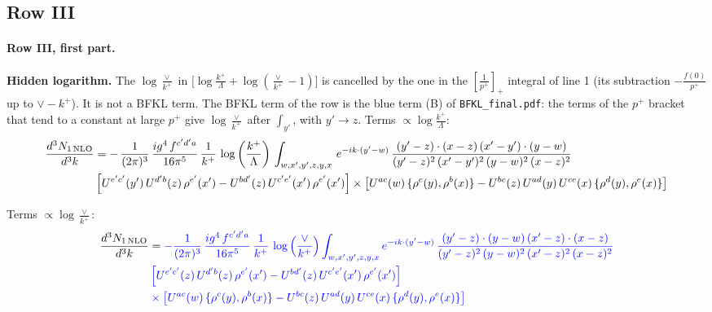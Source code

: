 \documentclass[10pt]{article}
\numberwithin{equation}{section}
\newcommand{\new}[1]{{\color{blue}#1}}
\newcommand{\nc}{\color{blue}}
\begin{document}
\subsection{Row III}
\paragraph{Row III, first part.}
\textbf{Hidden logarithm.} The $\log\frac{\vee}{k^+}$ in $\big[\log\frac{k^+}{\Lambda}+\log(\frac{\vee}{k^+}-1)\big]$ is cancelled by the one in the $\left[\frac{1}{p^+}\right]_+$ integral of line 1 (its subtraction $-\frac{f(0)}{p^+}$ up to $\vee-k^+$). It is not a BFKL term. The BFKL term of the row is the \new{blue} term (B) of \texttt{BFKL\_final.pdf}: the terms of the $p^+$ bracket that tend to a constant at large $p^+$ give $\log\frac{\vee}{k^+}$ after $\int_{y'}$, with $y'\to z$.
\noindent Terms $\propto\log\frac{k^+}{\Lambda}$:
\begin{align}
     \frac{d^{3}N_{1\,\rm NLO}}{d^{3}k} & =   -\,\frac{1}{(2\pi)^{3}}\, \frac{ig^{4}\,f^{c'd'a}}{16\pi^{5}}\, \frac{1}{k^{+}}\,\log{\left(\frac{k^{+}}{\Lambda}\right)}\, \int_{w,x',y',z,y,x}\, e^{-ik\cdot (y'-w)}\,\frac{(y'-z)\cdot (x-z)\,(x'-y')\cdot (y-w)}{(y'-z)^{2}\,(x'-y')^{2}\,(y-w)^{2}\,(x-z)^{2}}\notag \\ &  \left[U^{e'c'}(y')\,U^{d'b}(z)\,\rho^{e'}(x')-U^{bd'}(z)\,U^{c'e'}(x')\,\rho^{e'}(x')\right]\times  \left[U^{ac}(w)\, \{\rho^{c}(y),\rho^{b}(x)\}-U^{bc}(z)\,U^{ad}(y)\,U^{ce}(x)\,\{\rho^{d}(y),\rho^{e}(x)\}\right] \label{eq:J:G3III1}
\end{align}

\noindent Terms $\propto\log\frac{\vee}{k^+}$:
\begin{align}
     \frac{d^{3}N_{1\,\rm NLO}}{d^{3}k} & =  \nc -\frac{1}{(2\pi)^{3}}\, \frac{ig^{4}\,f^{c'd'a}}{16\pi^{5}}\, \frac{1}{k^{+}}\,\log{\left(\frac{\vee}{k^{+}}\right)}\int_{w,x',y',z,y,x} e^{-ik\cdot (y'-w)}\,\frac{(y'-z)\cdot (y-w)\,(x'-z)\cdot (x-z)}{(y'-z)^{2}\,(y-w)^{2}\,(x'-z)^{2}\,(x-z)^{2}}\notag \\
& \nc  \left[U^{e'c'}(z)\,U^{d'b}(z)\,\rho^{e'}(x')-U^{bd'}(z)\,U^{c'e'}(x')\,\rho^{e'}(x')\right]\notag \\
& \nc  \times\left[U^{ac}(w)\, \{\rho^{c}(y),\rho^{b}(x)\}-U^{bc}(z)\,U^{ad}(y)\,U^{ce}(x)\,\{\rho^{d}(y),\rho^{e}(x)\}\right] \label{eq:B:G3III1}
\end{align}
\end{document}
